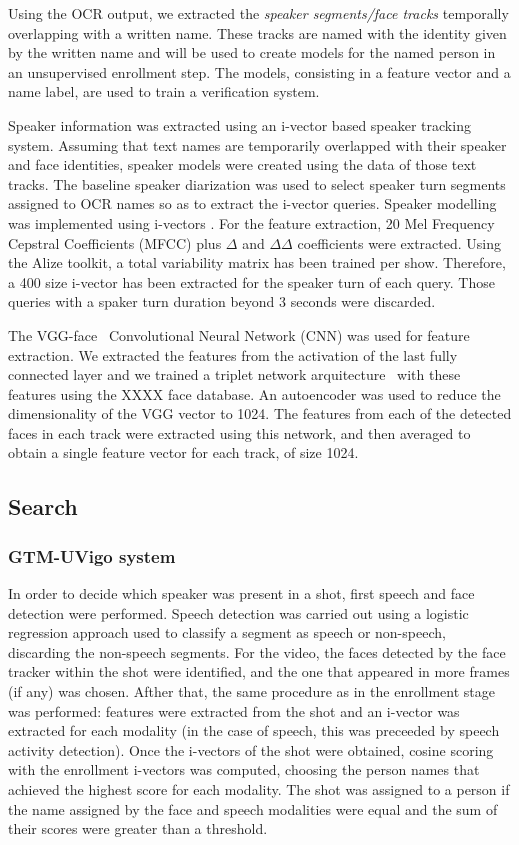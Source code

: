 Using the OCR output, we extracted the \textit{speaker segments/face tracks} temporally overlapping with a written name. These tracks are named with the identity given by the written name and will be used to create models for the named person in an unsupervised enrollment step. The models, consisting in a feature vector and a name label, are used to train a verification system.

Speaker information was extracted using an i-vector based speaker tracking system. Assuming that text names are temporarily overlapped with their speaker and face identities, speaker models were created using the data of those text tracks. The baseline speaker diarization was used to select speaker turn segments assigned to OCR names so as to extract the i-vector queries. Speaker modelling was implemented using i-vectors \cite{Dehak}. For the feature extraction, 20 Mel Frequency Cepstral Coefficients (MFCC) plus $\Delta$ and $\Delta\Delta$  coefficients were extracted. Using the Alize  toolkit\cite{Bonastre1,Bonastre2}, a total variability matrix has been trained per show. Therefore, a 400 size i-vector has been extracted for the speaker turn of each query. Those queries with a spaker turn duration beyond 3 seconds were discarded.

The VGG-face~\cite{Simonyan14c} Convolutional Neural Network (CNN) was used for feature extraction. We extracted the features from the activation of the last fully connected layer and we trained a triplet network arquitecture~\cite{parkhi15deep} with these features using the XXXX face database. An autoencoder was used to reduce the dimensionality of the VGG vector to 1024. 
The features from each of the detected faces in each track were extracted using this network, and then averaged to obtain a single feature vector for each track, of size 1024.

\subsection{Search}

\subsubsection{GTM-UVigo system}

In order to decide which speaker was present in a shot, first speech and face detection were performed. Speech detection was carried out using a logistic regression approach
used to classify a segment as speech or non-speech, discarding the non-speech segments. For the video, the faces detected by the face tracker within the shot were identified, 
and the one that appeared in more frames (if any) was chosen. Afther that, the same procedure as in the enrollment stage was performed: features were extracted from the shot
and an i-vector was extracted for each modality (in the case of speech, this was preceeded by speech activity detection). Once the i-vectors of the shot were obtained,
cosine scoring with the enrollment i-vectors was computed, choosing the person names that achieved the highest score for each modality. The shot was assigned to
a person if the name assigned by the face and
speech modalities were equal and the sum of their scores were greater than a threshold.

